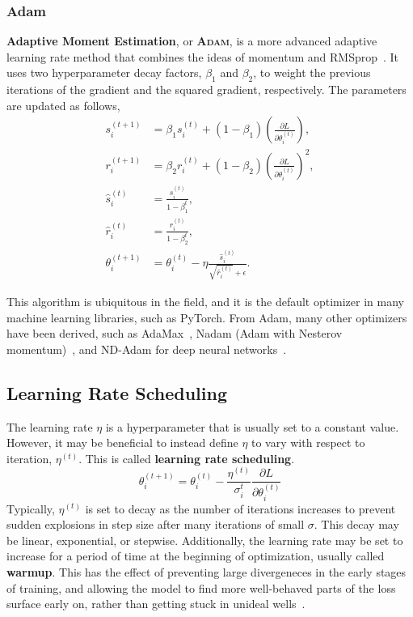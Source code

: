 \documentclass[12pt]{report}
\theoremstyle{definition}
\theoremstyle{remark}
\begin{document}
\subsubsection{Adam}
\textbf{Adaptive Moment Estimation}, or \textbf{\textsc{Adam}}, is a more advanced adaptive learning rate method that combines the ideas of momentum and RMSprop~\cite{kingma_adam_2017, bishop_deep_2023}. It uses two hyperparameter decay factors, $\beta_1$ and $\beta_2$, to weight the previous iterations of the gradient and the squared gradient, respectively. The parameters are updated as follows,
\begin{align}
    s_i^{(t+1)} &= \beta_1 s_i^{(t)} + (1-\beta_1) \left(\frac{\partial L}{\partial \theta_i^{(t)}}\right), \\
    r_i^{(t+1)} &= \beta_2 r_i^{(t)} + (1-\beta_2) \left(\frac{\partial L}{\partial \theta_i^{(t)}}\right)^2, \\
    \hat{s}_i^{(t)} &= \frac{s_i^{(t)}}{1-\beta_1^{t}}, \\
    \hat{r}_i^{(t)} &= \frac{r_i^{(t)}}{1-\beta_2^{t}}, \\
    \theta_i^{(t+1)} &= \theta_i^{(t)} - \eta \frac{\hat{s}_i^{(t)}}{\sqrt{\hat{r}_i^{(t)}} + \epsilon}.
\end{align}

This algorithm is ubiquitous in the field, and it is the default optimizer in many machine learning libraries, such as PyTorch. From Adam, many other optimizers have been derived, such as AdaMax~\cite{kingma_adam_2017}, Nadam (Adam with Nesterov momentum)~\cite{dozat_incorporating_2016}, and ND-Adam for deep neural networks~\cite{zhang_improved_2018}.

\subsection{Learning Rate Scheduling}

The learning rate $\eta$ is a hyperparameter that is usually set to a constant value. However, it may be beneficial to instead define $\eta$ to vary with respect to iteration, $\eta^{(t)}$. This is called \textbf{learning rate scheduling}.
\begin{equation}
    \theta_{i}^{(t+1)} = \theta_{i}^{(t)} - \frac{\eta^{(t)}}{\sigma_i^t}\frac{\partial L}{\partial \theta_i^{(t)}}
\end{equation}
Typically, $\eta^{(t)}$ is set to decay as the number of iterations increases to prevent sudden explosions in step size after many iterations of small $\sigma$. This decay may be linear, exponential, or stepwise. Additionally, the learning rate may be set to increase for a period of time at the beginning of optimization, usually called \textbf{warmup}. This has the effect of preventing large divergeneces in the early stages of training, and allowing the model to find more well-behaved parts of the loss surface early on, rather than getting stuck in unideal wells~\cite{liu_variance_2021, kalra_why_2024}.
\end{document}
